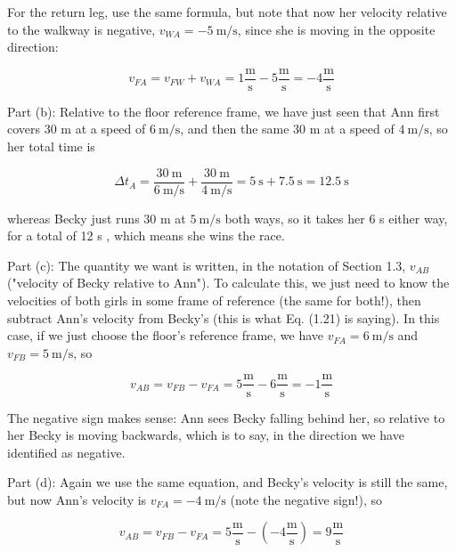 \documentclass[10pt]{article}
\begin{document}
For the return leg, use the same formula, but note that now her velocity relative to the walkway is negative, $v_{W A}=-5 \mathrm{~m} / \mathrm{s}$, since she is moving in the opposite direction:


\begin{equation*}
v_{F A}=v_{F W}+v_{W A}=1 \frac{\mathrm{m}}{\mathrm{s}}-5 \frac{\mathrm{m}}{\mathrm{s}}=-4 \frac{\mathrm{m}}{\mathrm{s}} \tag{1.26}
\end{equation*}


Part (b): Relative to the floor reference frame, we have just seen that Ann first covers 30 m at a speed of $6 \mathrm{~m} / \mathrm{s}$, and then the same 30 m at a speed of $4 \mathrm{~m} / \mathrm{s}$, so her total time is


\begin{equation*}
\Delta t_{A}=\frac{30 \mathrm{~m}}{6 \mathrm{~m} / \mathrm{s}}+\frac{30 \mathrm{~m}}{4 \mathrm{~m} / \mathrm{s}}=5 \mathrm{~s}+7.5 \mathrm{~s}=12.5 \mathrm{~s} \tag{1.27}
\end{equation*}


whereas Becky just runs 30 m at $5 \mathrm{~m} / \mathrm{s}$ both ways, so it takes her 6 s either way, for a total of 12 s , which means she wins the race.

Part (c): The quantity we want is written, in the notation of Section 1.3, $v_{A B}$ ("velocity of Becky relative to Ann"). To calculate this, we just need to know the velocities of both girls in some frame of reference (the same for both!), then subtract Ann's velocity from Becky's (this is what Eq. (1.21) is saying). In this case, if we just choose the floor's reference frame, we have $v_{F A}=6 \mathrm{~m} / \mathrm{s}$ and $v_{F B}=5 \mathrm{~m} / \mathrm{s}$, so


\begin{equation*}
v_{A B}=v_{F B}-v_{F A}=5 \frac{\mathrm{m}}{\mathrm{s}}-6 \frac{\mathrm{m}}{\mathrm{s}}=-1 \frac{\mathrm{m}}{\mathrm{s}} \tag{1.28}
\end{equation*}


The negative sign makes sense: Ann sees Becky falling behind her, so relative to her Becky is moving backwards, which is to say, in the direction we have identified as negative.

Part (d): Again we use the same equation, and Becky's velocity is still the same, but now Ann's velocity is $v_{F A}=-4 \mathrm{~m} / \mathrm{s}$ (note the negative sign!), so


\begin{equation*}
v_{A B}=v_{F B}-v_{F A}=5 \frac{\mathrm{m}}{\mathrm{s}}-\left(-4 \frac{\mathrm{m}}{\mathrm{s}}\right)=9 \frac{\mathrm{m}}{\mathrm{s}} \tag{1.29}
\end{equation*}
\end{document}

